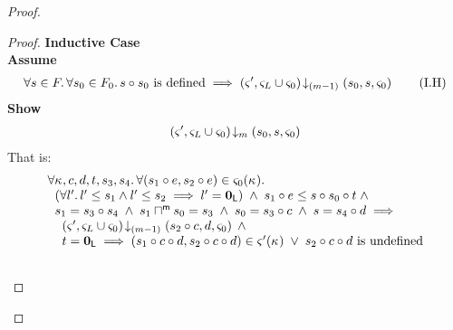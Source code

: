 \begin{lemma}[]
\begin{proof}
\begin{proof}
\noindent\textbf{Inductive Case}\\
\textbf{Assume}
\begin{align}
	\forall s \in F.\,\forall s_0 \in F_0.\, s \circ s_0 \text{ is defined} \implies \left(\varsigma_{}', \varsigma_{L} \cup \varsigma_{0}\right) \!\downarrow_{(m-1)} \left(s_0, s, \varsigma_{0}\right)
	\tag{I.H} \label{LAW:I.H}
\end{align}
\textbf{Show } 
%
\begin{align}
	\left(\varsigma_{}', \varsigma_{L} \cup \varsigma_{0}\right) \!\downarrow_{m} \left(s_0, s, \varsigma_{0}\right) \nonumber
\end{align}
%
That is:
%
\begin{align}
	&\begin{array}{l}
		\for{\ca{}, c, d, t, s_3, s_4}\for{(s_1 \composeL e, s_2 \composeL e) \in \amod{0}(\ca{})} \\
	\hspace*{0.2cm}\left(\for{l'} l' \leq s_1 \land l' \leq s_2 \implies l' = \unitL\right) \;\land\; s_1 \composeL e \leq  s \composeL s_0 \composeL t \;\land\\
	\hspace*{0.2cm} s_1 = s_3 \composeL s_4 \;\land\; s_1 \maxMeetL s_0 = s_3 \;\land\; s_0 = s_3 \composeL c \;\land\; s = s_4 \composeL d \implies\\
	\hspace*{0.4cm}\extendsAMUpto{\amod{}', \amod{L} \cup \amod{0}}{(m-1)}{s_2 \composeL c}{d}{\amod{0}} \;\land\\
	\hspace*{0.4cm} t = \unitL \implies (s_1 \composeL c \composeL d, s_2 \composeL c \composeL d) \in \amod{}'(\ca{}) \;\lor\; s_2 \composeL c \composeL d \text{ is undefined}
	\end{array} \label{LAW:Goal8} \\\nonumber\\

\end{align}
\end{proof}
\end{proof}
\end{lemma}
